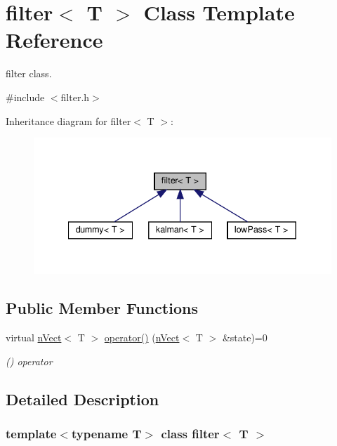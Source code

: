 \hypertarget{classfilter}{}\section{filter$<$ T $>$ Class Template Reference}
\label{classfilter}


filter class.  




{\ttfamily \#include $<$filter.\+h$>$}



Inheritance diagram for filter$<$ T $>$\+:\nopagebreak
\begin{figure}[H]
\begin{center}
\leavevmode
\includegraphics[width=340pt]{classfilter__inherit__graph}
\end{center}
\end{figure}
\subsection*{Public Member Functions}
\begin{DoxyCompactItemize}
\item 
virtual \hyperlink{classnVect}{n\+Vect}$<$ T $>$ \hyperlink{classfilter_ac8ec0fb4a10d10ee5e3133259610e0d2}{operator()} (\hyperlink{classnVect}{n\+Vect}$<$ T $>$ \&state)=0
\begin{DoxyCompactList}\small\item\em () operator \end{DoxyCompactList}\end{DoxyCompactItemize}


\subsection{Detailed Description}
\subsubsection*{template$<$typename T$>$\newline
class filter$<$ T $>$}

